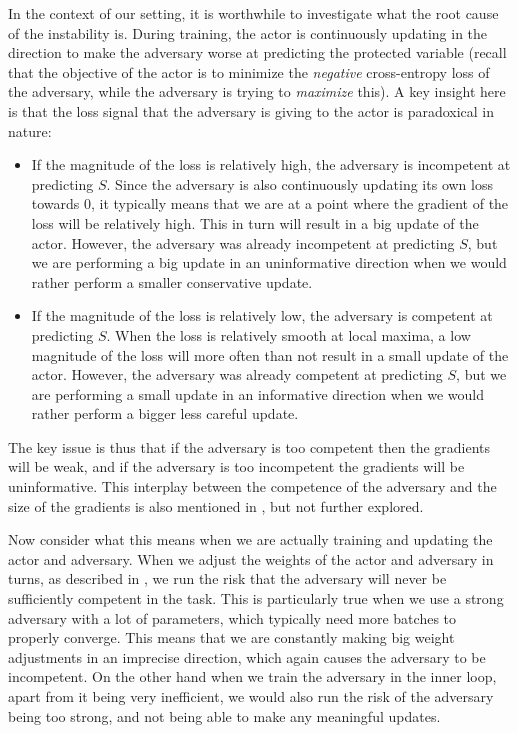 \documentclass[nohyperref]{article}
\theoremstyle{plain}
\theoremstyle{definition}
\theoremstyle{remark}
\begin{document}
In the context of our setting, it is worthwhile to investigate what the root cause of the instability is. During training, the actor is continuously updating in the direction to make the adversary worse at predicting the protected variable (recall that the objective of the actor is to minimize the \emph{negative} cross-entropy loss of the adversary, while the adversary is trying to \emph{maximize} this). A key insight here is that the loss signal that the adversary is giving to the actor is paradoxical in nature:
\begin{itemize}
    \item If the magnitude of the loss is relatively high, the adversary is incompetent at predicting $S$. Since the adversary is also continuously updating its own loss towards 0, it typically means that we are at a point where the gradient of the loss will be relatively high. This in turn will result in a big update of the actor. However, the adversary was already incompetent at predicting $S$, but we are performing a big update in an uninformative direction when we would rather perform a smaller conservative update.
    \item If the magnitude of the loss is relatively low, the adversary is competent at predicting $S$. When the loss is relatively smooth at local maxima, a low magnitude of the loss will more often than not result in a small update of the actor. However, the adversary was already competent at predicting $S$, but we are performing a small update in an informative direction when we would rather perform a bigger less careful update.
\end{itemize}
The key issue is thus that if the adversary is too competent then the gradients will be weak, and if the adversary is too incompetent the gradients will be uninformative. This interplay between the competence of the adversary and the size of the gradients is also mentioned in \cite{edwards2016censoring}, but not further explored. 

Now consider what this means when we are actually training and updating the actor and adversary. When we adjust the weights of the actor and adversary in turns, as described in \cite{NIPS2014_5ca3e9b1}, we run the risk that the adversary will never be sufficiently competent in the task. This is particularly true when we use a strong adversary with a lot of parameters, which typically need more batches to properly converge. This means that we are constantly making big weight adjustments in an imprecise direction, which again causes the adversary to be incompetent. On the other hand when we train the adversary in the inner loop, apart from it being very inefficient, we would also run the risk of the adversary being too strong, and not being able to make any meaningful updates.
\end{document}
